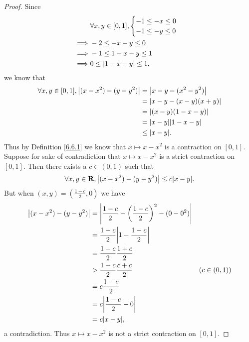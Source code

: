 \begin{proof}
    Since
    \begin{align*}
                 & \forall x, y \in [0, 1], \begin{cases}
                                                -1 \leq -x \leq 0 \\
                                                -1 \leq -y \leq 0
                                            \end{cases} \\
        \implies & -2 \leq -x - y \leq 0                      \\
        \implies & -1 \leq 1 - x - y \leq 1                   \\
        \implies & 0 \leq \abs*{1 - x - y} \leq 1,
    \end{align*}
    we know that
    \begin{align*}
        \forall x, y \in [0, 1], \abs*{(x - x^2) - (y - y^2)} & = \abs*{x - y - (x^2 - y^2)}    \\
                                                              & = \abs*{x - y - (x - y)(x + y)} \\
                                                              & = \abs*{(x - y)(1 - x - y)}     \\
                                                              & = \abs*{x - y} \abs*{1 - x - y} \\
                                                              & \leq \abs*{x - y}.
    \end{align*}
    Thus by Definition \ref{6.6.1} we know that \(x \mapsto x - x^2\) is a contraction on \([0, 1]\).
    Suppose for sake of contradiction that \(x \mapsto x - x^2\) is a strict contraction on \([0, 1]\).
    Then there exists a \(c \in (0, 1)\) such that
    \[
        \forall x, y \in \mathbf{R}, \abs*{(x - x^2) - (y - y^2)} \leq c \abs*{x - y}.
    \]
    But when \((x, y) = (\frac{1 - c}{2}, 0)\) we have
    \begin{align*}
        \abs*{(x - x^2) - (y - y^2)} & = \abs*{\frac{1 - c}{2} - \bigg(\frac{1 - c}{2}\bigg)^2 - (0 - 0^2)}                  \\
                                     & = \frac{1 - c}{2} \abs*{1 - \frac{1 - c}{2}}                                          \\
                                     & = \frac{1 - c}{2} \frac{1 + c}{2}                                                     \\
                                     & > \frac{1 - c}{2} \frac{c + c}{2}                                    & (c \in (0, 1)) \\
                                     & = c \frac{1 - c}{2}                                                                   \\
                                     & = c \abs*{\frac{1 - c}{2} - 0}                                                        \\
                                     & = c \abs*{x - y},
    \end{align*}
    a contradiction.
    Thus \(x \mapsto x - x^2\) is not a strict contraction on \([0, 1]\).
\end{proof}

